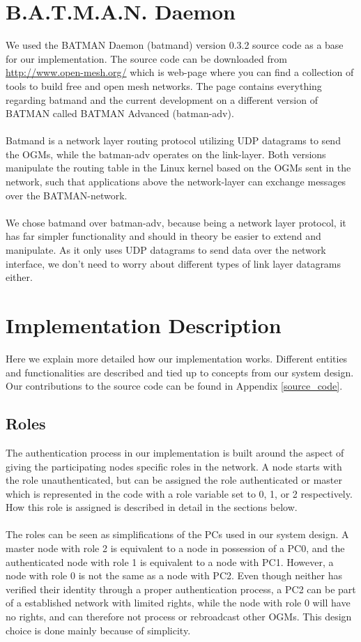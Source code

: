 \section{B.A.T.M.A.N. Daemon} \label{batmand}
We used the BATMAN Daemon (batmand) version 0.3.2 source code as a base for our implementation. The source code can be downloaded from \url{http://www.open-mesh.org/} which is web-page where you can find a collection of tools to build free and open mesh networks. The page contains everything regarding batmand and the current development on a different version of BATMAN called BATMAN Advanced (batman-adv).
\\\\
Batmand is a network layer routing protocol utilizing UDP datagrams to send the OGMs, while the batman-adv operates on the link-layer. Both versions manipulate the routing table in the Linux kernel based on the OGMs sent in the network, such that applications above the network-layer can exchange messages over the BATMAN-network.
\\\\
We chose batmand over batman-adv, because being a network layer protocol, it has far simpler functionality and should in theory be easier to extend and manipulate. As it only uses UDP datagrams to send data over the network interface, we don't need to worry about different types of link layer datagrams either.

\section{Implementation Description}
Here we explain more detailed how our implementation works. Different entities and functionalities are described and tied up to concepts from our system design. Our contributions to the source code can be found in Appendix \ref{source_code}.

\subsection{Roles}
The authentication process in our implementation is built around the aspect of giving the participating nodes specific roles in the network. A node starts with the role unauthenticated, but can be assigned the role authenticated or master which is represented in the code with a role variable set to 0, 1, or 2 respectively. How this role is assigned is described in detail in the sections below.
\\\\
The roles can be seen as simplifications of the PCs used in our system design. A master node with role 2 is equivalent to a node in possession of a PC0, and the authenticated node with role 1 is equivalent to a node with PC1. However, a node with role 0 is not the same as a node with PC2. Even though neither has verified their identity through a proper authentication process, a PC2 can be part of a established network with limited rights, while the node with role 0 will have no rights, and can therefore not process or rebroadcast other OGMs. This design choice is done mainly because of simplicity.

